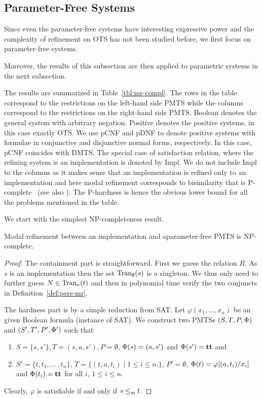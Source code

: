 \subsection{Parameter-Free Systems}


Since even the parameter-free systems have interesting expressive
power and the complexity of refinement on OTS has not been studied
before, 
we first focus on parameter-free systems.

Moreover, the results of this subsection are then applied
to parametric systems in the next subsection.

The results are summarized in Table~\ref{tbl:mr-compl}.
The rows in the table correspond 
to the restrictions on the left-hand side PMTS while the columns correspond 
to the restrictions on the right-hand side PMTS. Boolean denotes the general 
system with arbitrary negation. Positive denotes the positive systems, 
in this case exactly OTS. We use pCNF and pDNF to denote positive systems 
with formulae in conjunctive and disjunctive normal forms, respectively. 
In this case, pCNF coincides with DMTS. The special case of satisfaction 
relation, where the refining system is an implementation is denoted by Impl.
We do not include Impl to the columns as it makes sense that 
an implementation is refined only to an implementation and here modal
refinement corresponds to 
bisimilarity that is 
P-complete~\cite{balcazar1992dbp} (see also \cite{SawaJ05}). 
The P-hardness is hence the obvious lower bound for all the 
problems mentioned in the table. 





We start with the simplest NP-completeness result. 

\begin{proposition} 
Modal refinement between an implementation and a\linebreak parameter-free PMTS is NP-complete.
\end{proposition}
\begin{proof}
The containment part is straightforward. 
First we guess the relation $R$.
As $s$ is an implementation then 
the set $\mathrm{Tran}_{\emptyset}(s)$ is a singleton.
We thus only need to further guess $N \in \mathrm{Tran}_{\nu}(t)$ and then in polynomial 
time verify the two conjuncts in Definition~\ref{def:pers-mr}.

The hardness part is by a simple reduction from SAT. 
Let $\varphi(x_1, \ldots, x_n)$ be an given Boolean formula (instance of SAT).
We construct two PMTSs $(S,T,P,\mathrm{\Phi})$ and \linebreak  $(S',T',P',\mathrm{\Phi}')$ such that 
\begin{enumerate}
    \item $S = \{s,s'\}, T={(s,a,s')}, P= \emptyset$, $\mathrm{\Phi}(s) = (a,s')$ and $\mathrm{\Phi}(s') = \mathbf{tt}$ and 
    \item $S'= \{t, t_1, \ldots\ , t_n\}$, $T = \{(t,a,t_i) \mid 1 \le i \le n.\}$, 
$P' = \emptyset$, $\mathrm{\Phi}(t) = \varphi[(a,t_i)/x_i]$ and $\mathrm{\Phi}(t_i) = \mathbf{tt}$ 
for all $i$, $1\le i \le n$.
\end{enumerate}
Clearly, $\varphi$ is satisfiable if and only if $s \le_\mathrm m t$.
\end{proof}



